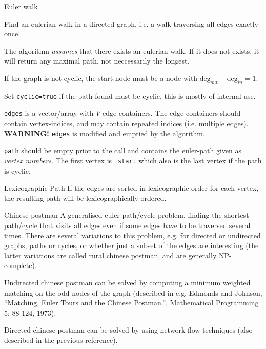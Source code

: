
\begin{algorithm}{Euler walk}

\desc
Find an eulerian walk in a directed graph, i.e. a walk traversing all
edges exactly once.

The algorithm \emph{assumes} that there exists an eulerian walk. If it
does not exists, it will return any maximal path, not neccessarily the
longest.

If the graph is not cyclic, the start node must be a node with
$\mathrm{deg}_{out}-\mathrm{deg}_{in} = 1$.

Set {\tt cyclic=true} if the path found must be cyclic, this is mostly
of internal use.

{\tt edges} is a vector/array with $V$ edge-containers. The
edge-containers should contain vertex-indices, and may contain
repeated indices (i.e. multiple edges). {\bf WARNING!} {\tt edges} is
modified and emptied by the algorithm.

{\tt path} should be empty prior to the call and contains the
euler-path given as \emph{vertex numbers}. The first vertex is {\tt
start} which also is the last vertex if the path is cyclic.

\item[Lexicographic Path] If the edges are sorted in lexicographic order for
each vertex, the resulting path will be lexicographically
ordered. 
\end{algorithm}


\begin{algorithm}{Chinese postman}
\desc
A generalised euler path/cycle problem, finding the shortest
path/cycle that visits all edges even if some edges have to be
traversed several times.  There are several variations to this
problem, e.g. for directed or undirected graphs, paths or cycles, or
whether just a subset of the edges are interesting (the latter
variations are called rural chinese postman, and are generally
NP-complete).

Undirected chinese postman can be solved by computing a minimum
weighted matching on the odd nodes of the graph (described in
e.g. Edmonds and Johnson, ``Matching, Euler Tours and the Chinese
Postman.'', Mathematical Programming 5: 88-124, 1973).

Directed chinese postman can be solved by using network flow
techniques (also described in the previous reference).
\end{algorithm}

